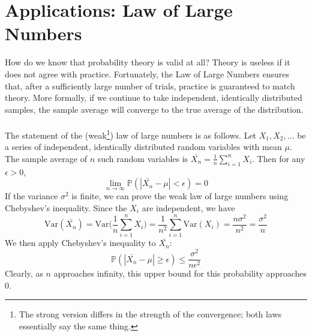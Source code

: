 \documentclass{article}
\newcommand{\PrMe}{\mathbb{P}}
\begin{document}
\section*{Applications: Law of Large Numbers}
How do we know that probability theory is valid at all? Theory is useless if it does not agree with practice. Fortunately, the Law of Large Numbers ensures that, after a sufficiently large number of trials, practice is guaranteed to match theory. More formally, if we continue to take independent, identically distributed samples, the sample average will converge to the true average of the distribution. \\\\
The statement of the (weak\footnote{The strong version differs in the strength of the convergence; both laws essentially say the same thing.}) law of large numbers is as follows. Let $X_1, X_2, \hdots$ be a series of independent, identically distributed random variables with mean $\mu$. The sample average of $n$ such random variables is $\bar{X_n} = \frac{1}{n}\sum_{i=1}^n X_i$. Then for any $\epsilon > 0$, $$\lim_{n \rightarrow \infty}\PrMe(|\bar{X_n} - \mu| < \epsilon) = 0$$
If the variance $\sigma^2$ is finite, we can prove the weak law of large numbers using Chebyshev's inequality. Since the $X_i$ are independent, we have $$\text{Var}(\bar{X_n}) = \text{Var}\big(\frac{1}{n}\sum_{i=1}^nX_i\big) = \frac{1}{n^2}\sum_{i=1}^n\text{Var}(X_i) = \frac{n\sigma^2}{n^2} = \frac{\sigma^2}{n}$$
We then apply Chebyshev's inequality to $\bar{X_n}$: $$\PrMe(|\bar{X_n} - \mu| \geq \epsilon) \leq \frac{\sigma^2}{n\epsilon^2}$$
Clearly, as $n$ approaches infinity, this upper bound for this probability approaches 0.
\end{document}
